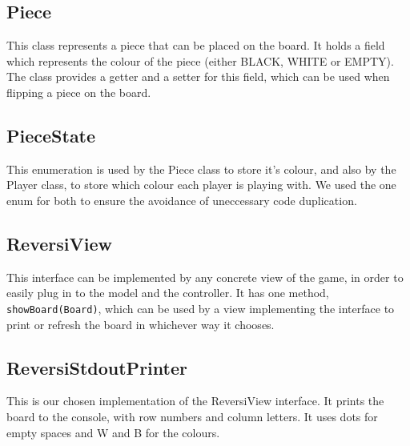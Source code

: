 \documentclass[11pt,a4paper,oneside]{report}
\begin{document}
\subsection*{Piece}
This class represents a piece that can be placed on the board. It holds a field which represents the colour of the piece (either BLACK, WHITE or EMPTY). The class provides a getter and a setter for this field, which can be used when flipping a piece on the board. 

\subsection*{PieceState}
This enumeration is used by the Piece class to store it's colour, and also by the Player class, to store which colour each player is playing with. We used the one enum for both to ensure the avoidance of uneccessary code duplication.

\subsection*{ReversiView}
This interface can be implemented by any concrete view of the game, in order to easily plug in to the model and the controller. It has one method, \texttt{showBoard(Board)}, which can be used by a view implementing the interface to print or refresh the board in whichever way it chooses.

\subsection*{ReversiStdoutPrinter}
This is our chosen implementation of the ReversiView interface. It prints the board to the console, with row numbers and column letters. It uses dots for empty spaces and W and B for the colours.
\end{document}
